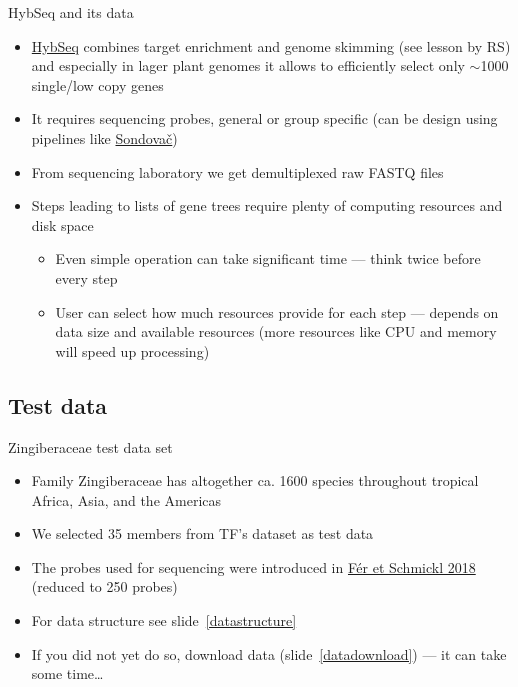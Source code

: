 \documentclass[compress, ucs, xelatex, 11pt, xcolor=x11names, aspectratio=169,
	hyperref={
		bookmarks=true,
		unicode=true,
		colorlinks=true,
		pdftitle={HybSeq course},
		plainpages=false,
		pdfauthor={Vojtech Zeisek},
		pdfsubject={Practical processing of HybSeq target enrichment sequencing data on computing grids like MetaCentrum},
		pdfcreator={XeLaTeX},
		pdfkeywords={BASH, command line, GNU, HybSeq, Linux, MetaCentrum, sequencing shell, target enrichment},
		linkcolor=Turquoise4, %
		anchorcolor=DodgerBlue4, %
		citecolor=DodgerBlue4, %
		filecolor=DodgerBlue4, %
		menucolor=Tan4, %
		urlcolor=DarkOliveGreen4, %
		pdftex},
	url={hyphens, lowtilde} %
	]{beamer}
\renewcommand{\texttt}[1]{\colorbox{Cornsilk2}{{\ttfamily #1}}}
\begin{document}
\begin{frame}{HybSeq and its data}
	\begin{itemize}
		\item \href{https://bsapubs.onlinelibrary.wiley.com/doi/full/10.3732/apps.1400042}{HybSeq} combines target enrichment and genome skimming (see lesson by RS) and especially in lager plant genomes it allows to efficiently select only $\sim$1000 single/low copy genes
		\item It requires sequencing probes, general or group specific (can be design using pipelines like \href{https://github.com/V-Z/sondovac/wiki}{Sondovač})
		\item From sequencing laboratory we get demultiplexed raw FASTQ files
		\item Steps leading to lists of gene trees require plenty of computing resources and disk space
		\begin{itemize}
			\item Even simple operation can take significant time --- think twice before every step
			\item User can select how much resources provide for each step --- depends on data size and available resources (more resources like CPU and memory will speed up processing)
		\end{itemize}
	\end{itemize}
\end{frame}

\subsection{Test data}

\begin{frame}{Zingiberaceae test data set}
	\begin{itemize}
		\item Family Zingiberaceae has altogether ca. 1600 species throughout tropical Africa, Asia, and the Americas
		\item We selected 35 members from TF's dataset as test data
		\item The probes used for sequencing were introduced in \href{https://journals.sagepub.com/doi/full/10.1177/1176934317742613}{Fér et Schmickl 2018} (reduced to 250 probes)
		\item For data structure see slide~\ref{datastructure}
		\item If you did not yet do so, download data (slide~\ref{datadownload}) --- it can take some time\ldots
	\end{itemize}
\end{frame}
\end{document}
